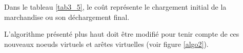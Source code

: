 Dans le tableau \ref{tab3_5}, le coût représente le chargement initial de la marchandise ou son déchargement final.

L'algorithme présenté plus haut doit être modifié pour tenir compte de ces
nouveaux noeuds virtuels et arêtes virtuelles (voir figure \ref{algo2}).

\begin{center}
\begin{figure}[htbp]
\center
{}
\end{figure}
\end{center}
